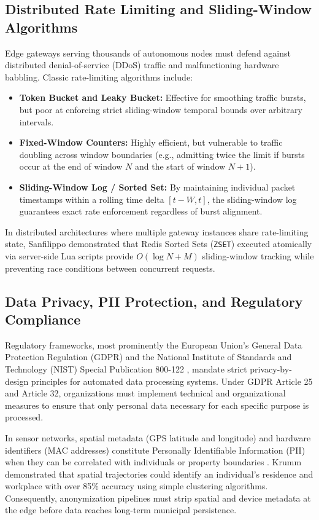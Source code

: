 \subsection{Distributed Rate Limiting and Sliding-Window Algorithms}
Edge gateways serving thousands of autonomous nodes must defend against distributed denial-of-service (DDoS) traffic and malfunctioning hardware babbling. Classic rate-limiting algorithms include:
\begin{itemize}
    \item \textbf{Token Bucket and Leaky Bucket:} Effective for smoothing traffic bursts, but poor at enforcing strict sliding-window temporal bounds over arbitrary intervals.
    \item \textbf{Fixed-Window Counters:} Highly efficient, but vulnerable to traffic doubling across window boundaries (e.g., admitting twice the limit if bursts occur at the end of window $N$ and the start of window $N+1$).
    \item \textbf{Sliding-Window Log / Sorted Set:} By maintaining individual packet timestamps within a rolling time delta $[t - W, t]$, the sliding-window log guarantees exact rate enforcement regardless of burst alignment.
\end{itemize}
In distributed architectures where multiple gateway instances share rate-limiting state, Sanfilippo \cite{redis_ratelimit} demonstrated that Redis Sorted Sets (\texttt{ZSET}) executed atomically via server-side Lua scripts provide $O(\log N + M)$ sliding-window tracking while preventing race conditions between concurrent requests.

\subsection{Data Privacy, PII Protection, and Regulatory Compliance}
Regulatory frameworks, most prominently the European Union's General Data Protection Regulation (GDPR) \cite{gdpr2016} and the National Institute of Standards and Technology (NIST) Special Publication 800-122 \cite{nist_sp800_122}, mandate strict privacy-by-design principles for automated data processing systems. Under GDPR Article 25 and Article 32, organizations must implement technical and organizational measures to ensure that only personal data necessary for each specific purpose is processed.

In sensor networks, spatial metadata (GPS latitude and longitude) and hardware identifiers (MAC addresses) constitute Personally Identifiable Information (PII) when they can be correlated with individuals or property boundaries \cite{krumm2009survey}. Krumm demonstrated that spatial trajectories could identify an individual's residence and workplace with over 85\% accuracy using simple clustering algorithms. Consequently, anonymization pipelines must strip spatial and device metadata at the edge before data reaches long-term municipal persistence.

